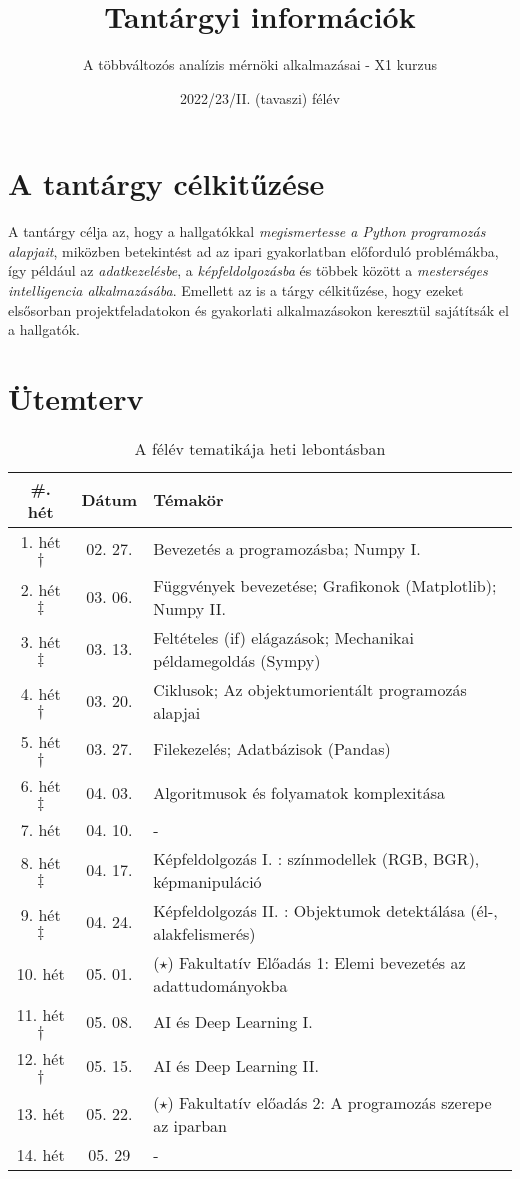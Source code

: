 \documentclass[12pt,a4paper]{article}
\title{Tantárgyi információk}
\author{A többváltozós analízis mérnöki alkalmazásai - X1 kurzus}
\date{2022/23/II. (tavaszi) félév}
\begin{document}
\maketitle{}
\thispagestyle{empty}
\section{A tantárgy célkitűzése}
A tantárgy célja az, hogy a hallgatókkal \textit{megismertesse a Python programozás alapjait}, miközben betekintést ad az ipari gyakorlatban előforduló problémákba, így például az \textit{adatkezelésbe}, a \textit{képfeldolgozásba} és többek között a \textit{mesterséges intelligencia alkalmazásába}. Emellett az is a tárgy célkitűzése, hogy ezeket elsősorban projektfeladatokon és gyakorlati alkalmazásokon keresztül sajátítsák el a hallgatók.
\section{Ütemterv}
\begin{table}[h!]
    \centering\vspace{-1em}
    \caption{A félév tematikája heti lebontásban}\vspace{0.5em}
    \begin{tabular}{|c|c|l|}
        \hline
        \#. \textbf{hét} & \textbf{Dátum} & \textbf{Témakör} \\\hline\hline
        1. hét $\dagger$  & 02. 27. & Bevezetés a programozásba; Numpy I. \\ \hline
        2. hét $\ddagger$ & 03. 06. & Függvények bevezetése; Grafikonok (Matplotlib); Numpy II. \\ \hline
        3. hét $\ddagger$ & 03. 13. & Feltételes (if) elágazások; Mechanikai példamegoldás (Sympy) \\ \hline
        4. hét $\dagger$ & 03. 20. & Ciklusok; Az objektumorientált programozás alapjai\\ \hline
        5. hét $\dagger$ & 03. 27. & Filekezelés; Adatbázisok (Pandas) \\ \hline
        6. hét $\ddagger$ & 04. 03. & Algoritmusok és folyamatok komplexitása \\ \hline
        7. hét & 04. 10. & - \\ \hline\hline
        8. hét $\ddagger$ & 04. 17. & Képfeldolgozás I. : színmodellek (RGB, BGR), képmanipuláció \\ \hline
        9. hét $\ddagger$ & 04. 24. & Képfeldolgozás II. : Objektumok detektálása (él-, alakfelismerés) \\ \hline
        10. hét & 05. 01. & ($\star$) Fakultatív Előadás 1: Elemi bevezetés az adattudományokba \\ \hline
        11. hét $\dagger$ & 05. 08. & AI és Deep Learning I. \\ \hline
        12. hét $\dagger$ & 05. 15. & AI és Deep Learning II. \\ \hline
        13. hét & 05. 22. & ($\star$) Fakultatív előadás 2: A programozás szerepe az iparban \\ \hline
        14. hét & 05. 29 & - \\ \hline
    \end{tabular}
\end{table}
\end{document}
